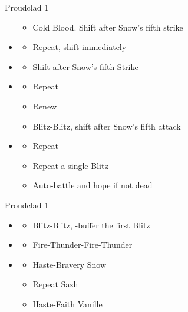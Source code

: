 \begin{paracol}{2}
\begin{battle}{Proudclad 1}
\begin{itemize}
\begin{itemize}
			      \item Cold Blood. Shift after Snow's fifth strike
		      \end{itemize}
		\item \fifth
		      \begin{itemize}
			      \item Repeat, shift immediately
		      \end{itemize}
		\item \sixth
		      \begin{itemize}
			      \item Shift after Snow's fifth Strike
		      \end{itemize}
		\item \first
		      \begin{itemize}
			      \item Repeat
			      \item Renew
			      \item Blitz-Blitz, shift after Snow's fifth attack
		      \end{itemize}
		\item \second
		      \begin{itemize}
			      \item Repeat
			      \item Repeat a single Blitz
			      \item Auto-battle and hope if not dead
		      \end{itemize}
	\end{itemize}
\end{battle}
\switchcolumn
\begin{battle}{Proudclad 1}
\begin{itemize}
    \item \second
    \begin{itemize}
        \item Blitz-Blitz, \rav-buffer the first Blitz
    \end{itemize}
    \item \sixth
    \begin{itemize}
        \item Fire-Thunder-Fire-Thunder
    \end{itemize}
    \item \fourth
    \begin{itemize}
        \item Haste-Bravery Snow
        \item Repeat Sazh
        \item Haste-Faith Vanille

\end{itemize}
\end{itemize}
\end{battle}
\end{paracol}
